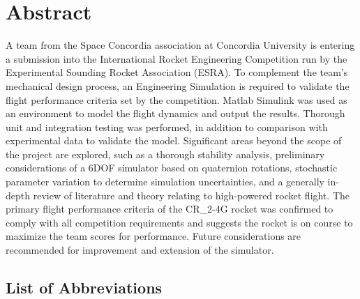 \documentclass[]{book}
\begin{document}
\chapter*{Abstract}
A team from the Space Concordia association at Concordia University is
entering a submission into the International Rocket Engineering
Competition run by the Experimental Sounding Rocket Association (ESRA).
To complement the team's mechanical design process, an Engineering
Simulation is required to validate the flight performance criteria set
by the competition. Matlab Simulink was used as an environment to model
the flight dynamics and output the results. Thorough unit and
integration testing was performed, in addition to comparison with
experimental data to validate the model. Significant areas beyond the
scope of the project are explored, such as a thorough stability
analysis, preliminary considerations of a 6DOF simulator based on
quaternion rotations, stochastic parameter variation to determine
simulation uncertainties, and a generally in-depth review of literature
and theory relating to high-powered rocket flight. The primary flight
performance criteria of the CR\_2-4G rocket was confirmed to comply with
all competition requirements and suggests the rocket is on course to
maximize the team scores for performance. Future considerations are
recommended for improvement and extension of the simulator.

\clearpage
\listoftables
\listoffigures
\clearpage
\section{List of Abbreviations}\label{list-of-abbreviations}
\end{document}
